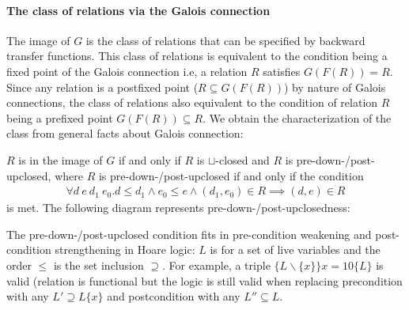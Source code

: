 \documentclass{llncs}
\newcommand{\join}{\sqcup}
\newcommand{\rotleq}{\rotatebox[origin=c]{90}{$\leq$}}
\begin{document}
\paragraph{The class of relations via the Galois connection}
  The image of $G$ is the class of relations that can be specified by backward transfer functions.
  This class of relations is equivalent to the condition being a fixed point of the Galois connection i.e, a relation $R$ satisfies $G(F(R)) = R$. Since any relation is a postfixed point ($R \subseteq G(F(R))$) by nature of Galois connections, the class of relations also equivalent to the condition of relation $R$ being a prefixed point $G(F(R)) \subseteq R$.
  We obtain the characterization of the class from general facts about Galois connection:
  \begin{proposition}\label{prop:predown-postup}
  $R$ is in the image of $G$ if and only if $R$ is $\join$-closed and $R$ is pre-down-/post-upclosed,
  where $R$ is pre-down-/post-upclosed if and only if the condition
  \begin{align*}
  \forall d\ e\ d_{1 }\ e_{0}. d \leq d_{1} \land e_{0} \leq e \land (d_{1}, e_{0}) \in R \implies (d, e) \in R
  \end{align*}
  is met.
  The following diagram represents pre-down-/post-upclosedness:
  \begin{center}
  \end{center}
  \end{proposition}


  \begin{example}
    The pre-down-/post-upclosed condition fits in pre-condition weakening and post-condition strengthening in Hoare logic: $L$ is for a set of live variables and the order $\leq$ is the set inclusion $\supseteq$.
    For example, a triple $\{ L \backslash \{ x \} \} x = 10 \{ L \}$ is valid (relation is functional but the logic is still valid when replacing precondition with any $L' \supseteq L \{ x \}$ and postcondition with any $L'' \subseteq L$.
  \end{example}
\end{document}
